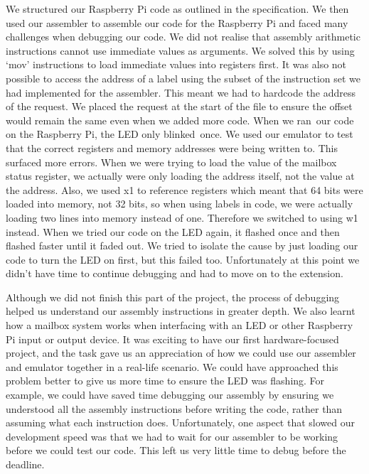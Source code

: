 \documentclass[11pt]{article}
\begin{document}
{We structured our Raspberry Pi code as outlined in the specification.
We then used our assembler to assemble our code for the Raspberry Pi and
faced many challenges when debugging our code. We did not realise that
assembly arithmetic instructions cannot use immediate values as
arguments. We solved this by using `mov' instructions to load immediate
values into registers first. It was also not possible to access the
address of a label using the subset of the instruction set we had
implemented for the assembler. This meant we had to hardcode the address
of the request. We placed the request at the start of the file to ensure
the offset would remain the same even when we added more code. When we
}{ran}{~our code on the Raspberry Pi, the LED only }{blinked}{~once. We
used our emulator to test that the correct registers and memory
addresses were being written to. This surfaced more errors. When we were
trying to load the value of the mailbox status register, we actually
were only loading the address itself, not the value at the address.
Also, we used x1 to reference registers which meant that 64 bits were
loaded into memory, not 32 bits, so when using labels in code, we were
actually loading two lines into memory instead of one. Therefore we
switched to using w1 instead. When we tried our code on the LED again,
it flashed once and then flashed faster until it faded out. We tried to
isolate the cause by just loading our code to turn the LED on first, but
this failed too. Unfortunately at this point we didn't have time to
continue debugging and had to move on to the extension.}

{}

{Although we did not finish this part of the project, the process of
debugging helped us understand our assembly instructions in greater
depth. We also learnt how a mailbox system works when interfacing with
an LED or other Raspberry Pi input or output device. It was exciting to
have our first hardware-focused project, and the task gave us an
appreciation of how we could use our assembler and emulator together in
a real-life scenario. We could have approached this problem better to
give us more time to ensure the LED was flashing. For example, we could
have saved time debugging our assembly by ensuring we understood all the
assembly instructions before writing the code, rather than assuming what
each instruction does. Unfortunately, one aspect that slowed our
development speed was that we had to wait for our assembler to be
working before we could test our code. This left us very little time to
debug before the deadline.}
\end{document}
